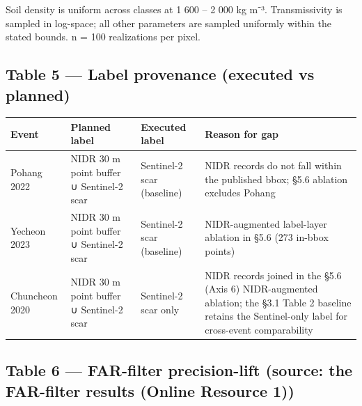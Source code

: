 \documentclass[11pt,a4paper]{article}
\newcounter{none}
\begin{document}
Soil density is uniform across classes at 1 600 -- 2 000 kg m⁻³. Transmissivity is sampled in log-space; all other parameters are sampled uniformly within the stated bounds. n = 100 realizations per pixel.

\subsection{Table 5 --- Label provenance (executed vs planned)}\label{table-5-label-provenance-executed-vs-planned}

{\def\LTcaptype{none} %
\begin{longtable}[]{@{}
  >{\raggedright\arraybackslash}p{}
  >{\raggedright\arraybackslash}p{}
  >{\raggedright\arraybackslash}p{}
  >{\raggedright\arraybackslash}p{}@{}}
\toprule\noalign{}
\begin{minipage}[b]{\linewidth}\raggedright
Event
\end{minipage} & \begin{minipage}[b]{\linewidth}\raggedright
Planned label
\end{minipage} & \begin{minipage}[b]{\linewidth}\raggedright
Executed label
\end{minipage} & \begin{minipage}[b]{\linewidth}\raggedright
Reason for gap
\end{minipage} \\
\midrule\noalign{}
\endhead
\bottomrule\noalign{}
\endlastfoot
Pohang 2022 & NIDR 30 m point buffer ∪ Sentinel-2 scar & Sentinel-2 scar (baseline) & NIDR records do not fall within the published bbox; §5.6 ablation excludes Pohang \\
Yecheon 2023 & NIDR 30 m point buffer ∪ Sentinel-2 scar & Sentinel-2 scar (baseline) & NIDR-augmented label-layer ablation in §5.6 (273 in-bbox points) \\
Chuncheon 2020 & NIDR 30 m point buffer ∪ Sentinel-2 scar & Sentinel-2 scar only & NIDR records joined in the §5.6 (Axis 6) NIDR-augmented ablation; the §3.1 Table 2 baseline retains the Sentinel-only label for cross-event comparability \\
\end{longtable}
}

\subsection{Table 6 --- FAR-filter precision-lift (source: the FAR-filter results (Online Resource 1))}\label{table-6-far-filter-precision-lift-source-the-far-filter-results-online-resource-1}
\end{document}
